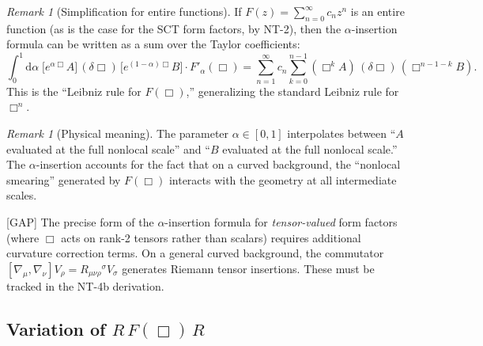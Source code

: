 \documentclass[12pt,a4paper]{article}
\theoremstyle{definition}
\theoremstyle{remark}
\newtheorem{remark}[proposition]{Remark}
\newcommand{\dd}{\mathrm{d}}
\newcommand{\gap}{\textcolor{red!80!black}{\textsf{[GAP]}}}
\begin{document}
\begin{remark}[Simplification for entire functions]
\label{rem:entire-simplification}
If $F(z) = \sum_{n=0}^\infty c_n z^n$ is an entire function (as is the
case for the SCT form factors, by NT-2), then the $\alpha$-insertion
formula can be written as a sum over the Taylor coefficients:
\begin{equation}\label{eq:alpha-taylor}
  \int_0^1\dd\alpha\;\big[e^{\alpha\Box}A\big]\,
  (\delta\Box)\,\big[e^{(1-\alpha)\Box}B\big]
  \cdot F'_\alpha(\Box)
  = \sum_{n=1}^\infty c_n \sum_{k=0}^{n-1}
    (\Box^k A)\,(\delta\Box)\,(\Box^{n-1-k} B).
\end{equation}
This is the ``Leibniz rule for $F(\Box)$,'' generalizing the standard
Leibniz rule for $\Box^n$.
\end{remark}

\begin{remark}[Physical meaning]
\label{rem:alpha-meaning}
The parameter $\alpha \in [0,1]$ interpolates between ``$A$ evaluated
at the full nonlocal scale'' and ``$B$ evaluated at the full nonlocal
scale.''  The $\alpha$-insertion accounts for the fact that on a curved
background, the ``nonlocal smearing'' generated by $F(\Box)$ interacts
with the geometry at all intermediate scales.
\end{remark}

\gap\; The precise form of the $\alpha$-insertion formula for
\emph{tensor-valued} form factors (where $\Box$ acts on rank-2 tensors
rather than scalars) requires additional curvature correction terms.
On a general curved background, the commutator
$[\nabla_\mu, \nabla_\nu]V_\rho = R_{\mu\nu\rho}{}^\sigma V_\sigma$
generates Riemann tensor insertions.  These must be tracked in the
NT-4b derivation.


\subsection{Variation of $R\,F(\Box)\,R$}
\end{document}
